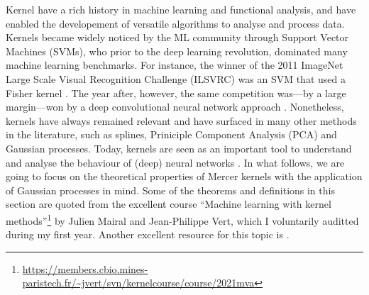 Kernel have a rich history in machine learning and functional analysis, and have enabled the developement of versatile algorithms to analyse and process data. Kernels became widely noticed by the ML community through Support Vector Machines (SVMs), who prior to the deep learning revolution, dominated many machine learning benchmarks. %
For instance, the winner of the 2011 ImageNet Large Scale Visual Recognition Challenge (ILSVRC) was an SVM that used a Fisher kernel \citep{perronnin2010large}. The year after, however, the same competition was---by a large margin---won by a deep convolutional neural network approach \citep[AlexNet]{alexnet}. Nonetheless, kernels have always remained relevant and have surfaced in many other methods in the literature, such as splines, Priniciple Component Analysis (PCA) and Gaussian processes. Today, kernels are seen as an important tool to understand and analyse the behaviour of (deep) neural networks \citep[e.g.,][]{jacot2018neural}. %
In what follows, we are going to focus on the theoretical properties of Mercer kernels with the application of Gaussian processes in mind. Some of the theorems and definitions in this section are quoted from the excellent course ``Machine learning with kernel methods''\footnote{\url{https://members.cbio.mines-paristech.fr/~jvert/svn/kernelcourse/course/2021mva}} by Julien Mairal and Jean-Philippe Vert, which I voluntarily auditted during my first year. Another excellent resource for this topic is \citet{kanagawa2018gaussian}.

